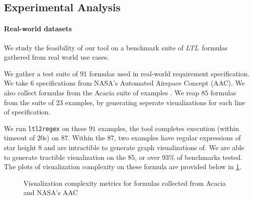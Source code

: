 \documentclass[preprint,12pt]{elsarticle}
\theoremstyle{definition}
\theoremstyle{remark}
\newcommand{\ltl}{\textit{LTL}}
\begin{document}
\subsection{Experimental Analysis} %

\paragraph{Real-world datasets} We study the feasibility of our tool on a benchmark suite of \ltl\ formulas gathered from real world use cases.

We gather a test suite of 91 formulas used in real-world requirement specification. We take $6$ specifications from NASA's Automated Airspace Concept (AAC)\cite{GCMTR16}. We also collect formulas from the Acacia suite of examples \cite{RV10}. We reap $85$ formulas from the suite of $23$ examples, by generating seperate visualizations for each line of specification. %

We run \texttt{ltl2regex} on these $91$ examples, the tool completes execution (within timeout of $20$s) on $87$. Within the $87$, two examples have regular expressions of star height $8$ and are intractible to generate graph visualizations of. We are able to generate tractible visualization on the $85$, or over $93\%$ of benchmarks tested. The plots of visualization complexity on these formula are provided below in \cref{fig:real-world}.


\begin{figure}[h!]
    \centering
    \quad %
    \caption{Visualization complexity metrics for formulas collected from Acacia \cite{RV10} and NASA's  AAC \cite{GCMTR16}}
    \label{fig:real-world}
\end{figure}
\end{document}
